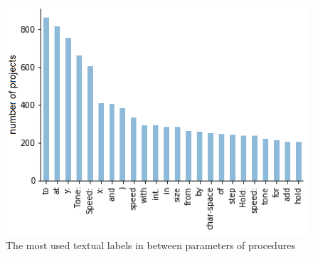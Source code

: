 \documentclass[conference]{IEEEtran}
\begin{document}
\begin{figure}
	\begin{center}
		\includegraphics[width=\columnwidth]{fig/project/labels_in_procedures}
		\caption{The most used textual labels in between parameters of procedures}
		\label{fig:labels}
	\end{center}
\end{figure} 
\end{document}
